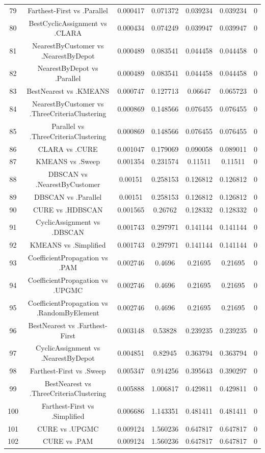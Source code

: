 \documentclass[a4paper,10pt]{article}
\begin{document}
\begin{landscape}
\begin{table}[!htp]
\begin{tabular}{ccccccc}
79&Farthest-First vs .Parallel&0.000417&0.071372&0.039234&0.039234&0\\
80&BestCyclicAssignment vs .CLARA&0.000434&0.074249&0.039947&0.039947&0\\
81&NearestByCustomer vs .NearestByDepot&0.000489&0.083541&0.044458&0.044458&0\\
82&NearestByDepot vs .Parallel&0.000489&0.083541&0.044458&0.044458&0\\
83&BestNearest vs .KMEANS&0.000747&0.127713&0.06647&0.065723&0\\
84&NearestByCustomer vs .ThreeCriteriaClustering&0.000869&0.148566&0.076455&0.076455&0\\
85&Parallel vs .ThreeCriteriaClustering&0.000869&0.148566&0.076455&0.076455&0\\
86&CLARA vs .CURE&0.001047&0.179069&0.090058&0.089011&0\\
87&KMEANS vs .Sweep&0.001354&0.231574&0.11511&0.11511&0\\
88&DBSCAN vs .NearestByCustomer&0.00151&0.258153&0.126812&0.126812&0\\
89&DBSCAN vs .Parallel&0.00151&0.258153&0.126812&0.126812&0\\
90&CURE vs .HDBSCAN&0.001565&0.26762&0.128332&0.128332&0\\
91&CyclicAssignment vs .DBSCAN&0.001743&0.297971&0.141144&0.141144&0\\
92&KMEANS vs .Simplified&0.001743&0.297971&0.141144&0.141144&0\\
93&CoefficientPropagation vs .PAM&0.002746&0.4696&0.21695&0.21695&0\\
94&CoefficientPropagation vs .UPGMC&0.002746&0.4696&0.21695&0.21695&0\\
95&CoefficientPropagation vs .RandomByElement&0.002746&0.4696&0.21695&0.21695&0\\
96&BestNearest vs .Farthest-First&0.003148&0.53828&0.239235&0.239235&0\\
97&CyclicAssignment vs .NearestByDepot&0.004851&0.82945&0.363794&0.363794&0\\
98&Farthest-First vs .Sweep&0.005347&0.914256&0.395643&0.390297&0\\
99&BestNearest vs .ThreeCriteriaClustering&0.005888&1.006817&0.429811&0.429811&0\\
100&Farthest-First vs .Simplified&0.006686&1.143351&0.481411&0.481411&0\\
101&CURE vs .UPGMC&0.009124&1.560236&0.647817&0.647817&0\\
102&CURE vs .PAM&0.009124&1.560236&0.647817&0.647817&0\\

\end{tabular}
\end{table}
\end{landscape}
\end{document}
